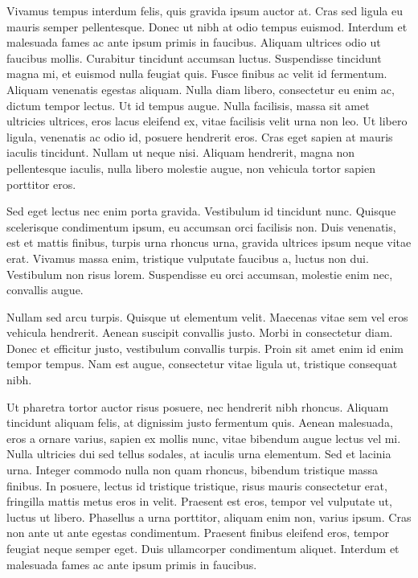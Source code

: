 Vivamus tempus interdum felis, quis gravida ipsum auctor at. Cras sed ligula eu mauris semper pellentesque. Donec ut nibh at odio tempus euismod. Interdum et malesuada fames ac ante ipsum primis in faucibus. Aliquam ultrices odio ut faucibus mollis. Curabitur tincidunt accumsan luctus. Suspendisse tincidunt magna mi, et euismod nulla feugiat quis. Fusce finibus ac velit id fermentum. Aliquam venenatis egestas aliquam. Nulla diam libero, consectetur eu enim ac, dictum tempor lectus. Ut id tempus augue. Nulla facilisis, massa sit amet ultricies ultrices, eros lacus eleifend ex, vitae facilisis velit urna non leo. Ut libero ligula, venenatis ac odio id, posuere hendrerit eros. Cras eget sapien at mauris iaculis tincidunt. Nullam ut neque nisi. Aliquam hendrerit, magna non pellentesque iaculis, nulla libero molestie augue, non vehicula tortor sapien porttitor eros.

Sed eget lectus nec enim porta gravida. Vestibulum id tincidunt nunc. Quisque scelerisque condimentum ipsum, eu accumsan orci facilisis non. Duis venenatis, est et mattis finibus, turpis urna rhoncus urna, gravida ultrices ipsum neque vitae erat. Vivamus massa enim, tristique vulputate faucibus a, luctus non dui. Vestibulum non risus lorem. Suspendisse eu orci accumsan, molestie enim nec, convallis augue.

Nullam sed arcu turpis. Quisque ut elementum velit. Maecenas vitae sem vel eros vehicula hendrerit. Aenean suscipit convallis justo. Morbi in consectetur diam. Donec et efficitur justo, vestibulum convallis turpis. Proin sit amet enim id enim tempor tempus. Nam est augue, consectetur vitae ligula ut, tristique consequat nibh.

Ut pharetra tortor auctor risus posuere, nec hendrerit nibh rhoncus. Aliquam tincidunt aliquam felis, at dignissim justo fermentum quis. Aenean malesuada, eros a ornare varius, sapien ex mollis nunc, vitae bibendum augue lectus vel mi. Nulla ultricies dui sed tellus sodales, at iaculis urna elementum. Sed et lacinia urna. Integer commodo nulla non quam rhoncus, bibendum tristique massa finibus. In posuere, lectus id tristique tristique, risus mauris consectetur erat, fringilla mattis metus eros in velit. Praesent est eros, tempor vel vulputate ut, luctus ut libero. Phasellus a urna porttitor, aliquam enim non, varius ipsum. Cras non ante ut ante egestas condimentum. Praesent finibus eleifend eros, tempor feugiat neque semper eget. Duis ullamcorper condimentum aliquet. Interdum et malesuada fames ac ante ipsum primis in faucibus.

